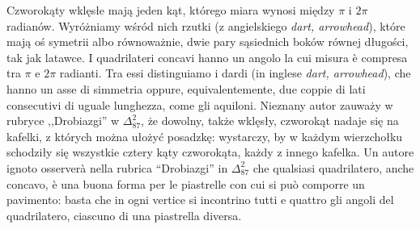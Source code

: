 Czworokąty wklęsłe mają jeden kąt, którego miara wynosi między $\pi$ i $2\pi$ radianów. %
Wyróżniamy wśród nich rzutki (z angielskiego \emph{dart, arrowhead}), które mają oś symetrii albo równoważnie, dwie pary sąsiednich boków równej długości, tak jak latawce. %
I quadrilateri concavi hanno un angolo la cui misura è compresa tra $\pi$ e $2\pi$ radianti. %
Tra essi distinguiamo i dardi (in inglese \emph{dart, arrowhead}), che hanno un asse di simmetria oppure, equivalentemente, due coppie di lati consecutivi di uguale lunghezza, come gli aquiloni. %
Nieznany autor zauważy w rubryce ,,Drobiazgi'' w $\Delta_{87}^{2}$, że dowolny, także wklęsły, czworokąt nadaje się na kafelki, z których można ułożyć posadzkę: wystarczy, by w każdym wierzchołku schodziły się wszystkie cztery kąty czworokąta, każdy z innego kafelka. %
Un autore ignoto osserverà nella rubrica ``Drobiazgi'' in $\Delta_{87}^{2}$ che qualsiasi quadrilatero, anche concavo, è una buona forma per le piastrelle con cui si può comporre un pavimento: basta che in ogni vertice si incontrino tutti e quattro gli angoli del quadrilatero, ciascuno di una piastrella diversa. %

